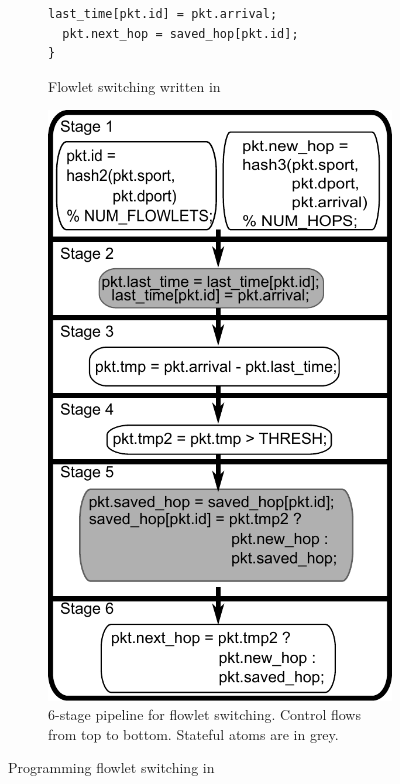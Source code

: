 \begin{figure}[!t]
\begin{subfigure}{0.5\textwidth}
\begin{small}
\begin{lstlisting}[style=customc]
  last_time[pkt.id] = pkt.arrival;
  pkt.next_hop = saved_hop[pkt.id];
}
\end{lstlisting}
\end{small}
\caption{Flowlet switching written in \pktlanguage}
\label{fig:flowlet_code}
\end{subfigure}
%
%
\begin{subfigure}{0.4\textwidth}
\includegraphics[width=0.9\columnwidth]{domino_pipe.pdf}
\caption{6-stage \absmachine pipeline for flowlet
switching.  Control flows from top to bottom. Stateful atoms are in grey.}
\label{fig:flowlet_pipeline}
\end{subfigure}
\caption{Programming flowlet switching in \pktlanguage}
\end{figure}

